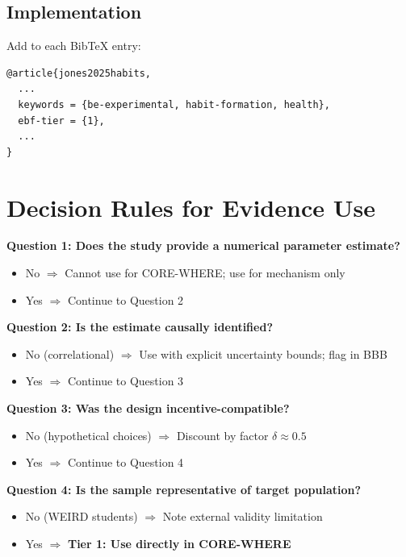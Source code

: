\documentclass[11pt, a4paper]{article}
\begin{document}
\subsection{Implementation}

Add to each BibTeX entry:
\begin{verbatim}
@article{jones2025habits,
  ...
  keywords = {be-experimental, habit-formation, health},
  ebf-tier = {1},
  ...
}
\end{verbatim}


\section{Decision Rules for Evidence Use}
\label{sec:evd-rules}

\begin{tcolorbox}[colback=green!10!white, colframe=green!75!black,
    title=Evidence Use Decision Tree]

\textbf{Question 1: Does the study provide a numerical parameter estimate?}
\begin{itemize}[nosep]
    \item No $\Rightarrow$ Cannot use for CORE-WHERE; use for mechanism only
    \item Yes $\Rightarrow$ Continue to Question 2
\end{itemize}

\textbf{Question 2: Is the estimate causally identified?}
\begin{itemize}[nosep]
    \item No (correlational) $\Rightarrow$ Use with explicit uncertainty bounds; flag in BBB
    \item Yes $\Rightarrow$ Continue to Question 3
\end{itemize}

\textbf{Question 3: Was the design incentive-compatible?}
\begin{itemize}[nosep]
    \item No (hypothetical choices) $\Rightarrow$ Discount by factor $\delta \approx 0.5$
    \item Yes $\Rightarrow$ Continue to Question 4
\end{itemize}

\textbf{Question 4: Is the sample representative of target population?}
\begin{itemize}[nosep]
    \item No (WEIRD students) $\Rightarrow$ Note external validity limitation
    \item Yes $\Rightarrow$ \textbf{Tier 1: Use directly in CORE-WHERE}
\end{itemize}

\end{tcolorbox}
\end{document}
